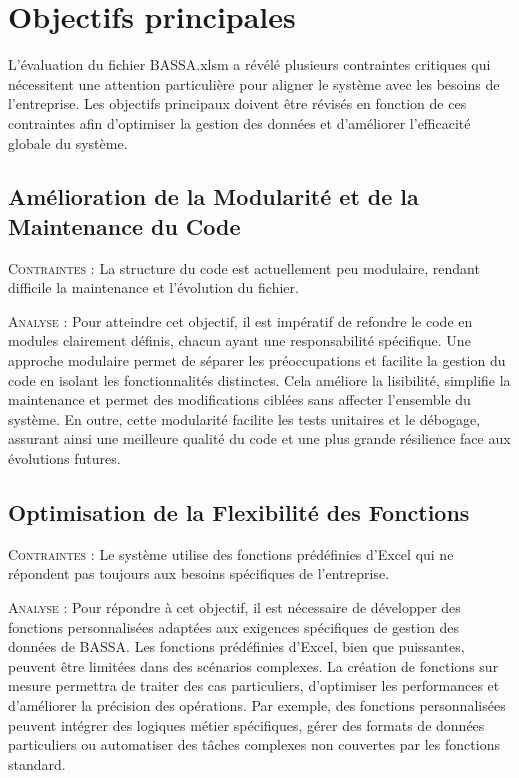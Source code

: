 \documentclass[a4paper, oneside, 12pt, final]{extreport}
\begin{document}
\section{Objectifs principales}
L’évaluation du fichier BASSA.xlsm a révélé plusieurs contraintes critiques qui nécessitent une attention particulière pour aligner le système avec les besoins de l’entreprise. Les objectifs principaux doivent être révisés en fonction de ces contraintes afin d’optimiser la gestion des données et d’améliorer l’efficacité globale du système.

\subsection{Amélioration de la Modularité et de la Maintenance du Code}
\textsc{Contraintes} : La structure du code est actuellement peu modulaire, rendant difficile la maintenance et l'évolution du fichier.

\textsc{Analyse} : Pour atteindre cet objectif, il est impératif de refondre le code en modules clairement définis, chacun ayant une responsabilité spécifique. Une approche modulaire permet de séparer les préoccupations et facilite la gestion du code en isolant les fonctionnalités distinctes. Cela améliore la lisibilité, simplifie la maintenance et permet des modifications ciblées sans affecter l’ensemble du système. En outre, cette modularité facilite les tests unitaires et le débogage, assurant ainsi une meilleure qualité du code et une plus grande résilience face aux évolutions futures.

\subsection{Optimisation de la Flexibilité des Fonctions}
\textsc{Contraintes} : Le système utilise des fonctions prédéfinies d'Excel qui ne répondent pas toujours aux besoins spécifiques de l'entreprise.

\textsc{Analyse} : Pour répondre à cet objectif, il est nécessaire de développer des fonctions personnalisées adaptées aux exigences spécifiques de gestion des données de BASSA. Les fonctions prédéfinies d'Excel, bien que puissantes, peuvent être limitées dans des scénarios complexes. La création de fonctions sur mesure permettra de traiter des cas particuliers, d’optimiser les performances et d’améliorer la précision des opérations. Par exemple, des fonctions personnalisées peuvent intégrer des logiques métier spécifiques, gérer des formats de données particuliers ou automatiser des tâches complexes non couvertes par les fonctions standard.
\end{document}
